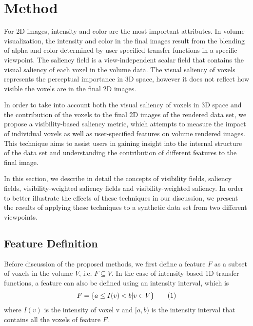 \section{Method}
For 2D images, intensity and color are the most important attributes. In volume visualization, the intensity and color in the final images result from the blending of alpha and color determined by user-specified transfer functions in a specific viewpoint.
The saliency field is a view-independent scalar field that contains the visual saliency of each voxel in the volume data. The visual saliency of voxels represents the perceptual importance in 3D space, however it does not reflect how visible the voxels are in the final 2D images.

In order to take into account both the visual saliency of voxels in 3D space and the contribution of the voxels to the final 2D images of the rendered data set, we propose a visibility-based saliency metric, which attempts to measure the impact of individual voxels as well as user-specified features on volume rendered images.
This technique aims to assist users in gaining insight into the internal structure of the data set and understanding the contribution of different features to the final image.



In this section, we describe in detail the concepts of visibility fields, saliency fields, visibility-weighted saliency fields and visibility-weighted saliency. In order to better illustrate the effects of these techniques in our discussion, we present the results of applying these techniques to a synthetic data set from two different viewpoints.

\subsection{Feature Definition \label{feature_definition}}
Before discussion of the proposed methods, we first define a feature $ F $ as a subset of voxels in the volume $ V $, i.e. $ F\subseteq V $.
In the case of intensity-based 1D transfer functions, a feature can also be defined using an intensity interval, which is
\[ F=\{ a \leq I(v) <b | v \in V \} 
\addtag \]
where $ I(v) $ is the intensity of voxel v and $ [a,b) $ is the intensity interval that contains all the voxels of feature $F$.

